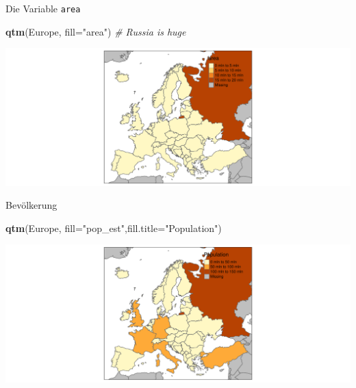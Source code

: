 \documentclass[ignorenonframetext,]{beamer}
\newenvironment{Shaded}{\begin{snugshade}}{\end{snugshade}}
\newcommand{\KeywordTok}[1]{\textcolor[rgb]{0.13,0.29,0.53}{\textbf{#1}}}
\newcommand{\DataTypeTok}[1]{\textcolor[rgb]{0.13,0.29,0.53}{#1}}
\newcommand{\StringTok}[1]{\textcolor[rgb]{0.31,0.60,0.02}{#1}}
\newcommand{\CommentTok}[1]{\textcolor[rgb]{0.56,0.35,0.01}{\textit{#1}}}
\newcommand{\NormalTok}[1]{#1}
\begin{document}
\begin{frame}[fragile]{Die Variable \texttt{area}}

\begin{Shaded}
\begin{Highlighting}[]
\KeywordTok{qtm}\NormalTok{(Europe, }\DataTypeTok{fill=}\StringTok{"area"}\NormalTok{) }\CommentTok{# Russia is huge}
\end{Highlighting}
\end{Shaded}

\includegraphics{tmap_files/figure-beamer/unnamed-chunk-16-1.pdf}

\end{frame}

\begin{frame}[fragile]{Bevölkerung}

\begin{Shaded}
\begin{Highlighting}[]
\KeywordTok{qtm}\NormalTok{(Europe, }\DataTypeTok{fill=}\StringTok{"pop_est"}\NormalTok{,}\DataTypeTok{fill.title=}\StringTok{"Population"}\NormalTok{) }
\end{Highlighting}
\end{Shaded}

\includegraphics{tmap_files/figure-beamer/unnamed-chunk-17-1.pdf}

\end{frame}
\end{document}
